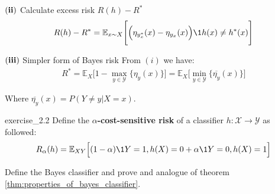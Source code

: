 \begin{solution*}
\begin{subproof}{\newline $\bf (ii)$ Calculate excess risk $R(h) - R^*$}
        \begin{align*}
             R(h) - R^*  = \mathbb{E}_{x\sim X}\Bigg[ \Big( \eta_{y^*_x}(x) - \eta_{y_x}(x) \Big) \1{h(x)\ne h^*(x)} \Bigg]
        \end{align*}
    \end{subproof}

    \begin{subproof}{$\bf (iii)$ Simpler form of Bayes risk}
        From $(i)$ we have:
        \begin{align*}
            R^* = \mathbb{E}_X\Big[ 1 - \max_{y\in\mathcal{Y}}\Big\{ \eta_y(x) \Big\} \Big] = \mathbb{E}_X\Big[\min_{y\in\mathcal{Y}} \Big\{ \overline{\eta_y}(x) \Big\} \Big]
        \end{align*}

        \noindent Where $\overline{\eta_y}(x)=P(Y\ne y|X=x)$.
    \end{subproof}
\end{solution*}

\begin{exercise}{}{exercise_2.2}
    Define the \textbf{$\alpha$-cost-sensitive risk} of a classifier $h:\mathcal{X}\to\mathcal{Y}$ as followed:
    \begin{align*}
        R_\alpha(h) = \mathbb{E}_{XY}\Big[ (1-\alpha)\1{Y=1, h(X)=0} + \alpha\1{Y=0, h(X)=1} \Big]
    \end{align*}

    \noindent Define the Bayes classifier and prove and analogue of theorem \ref{thm:properties_of_bayes_classifier}.
\end{exercise}

